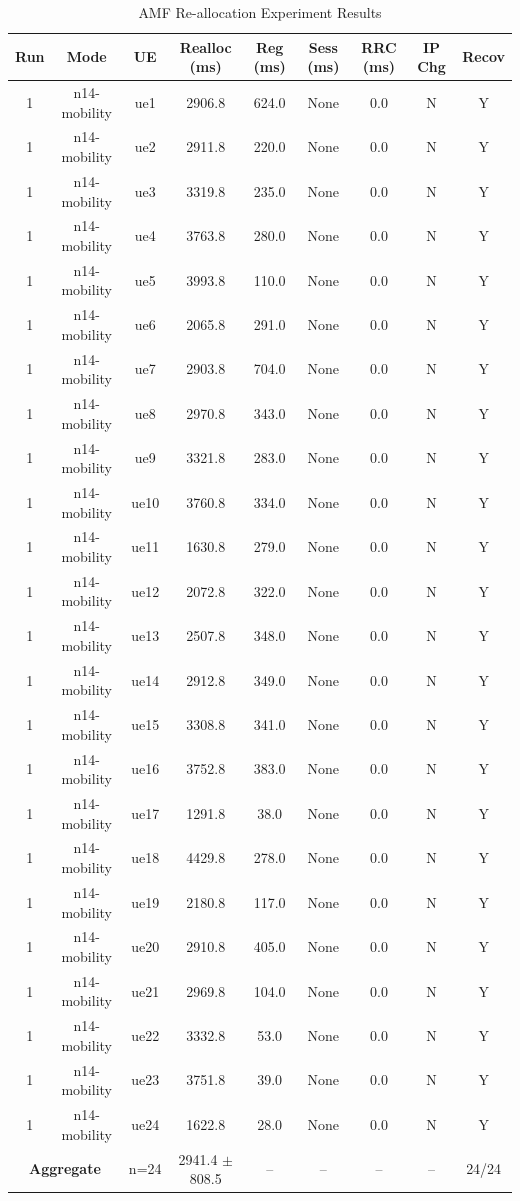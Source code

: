 \begin{table}[ht]
\centering
\begin{tabular}{|c|c|c|c|c|c|c|c|c|}
\hline
Run & Mode & UE & Realloc (ms) & Reg (ms) & Sess (ms) & RRC (ms) & IP Chg & Recov \\
\hline
1 & n14-mobility & ue1 & 2906.8 & 624.0 & None & 0.0 & N & Y \\
1 & n14-mobility & ue2 & 2911.8 & 220.0 & None & 0.0 & N & Y \\
1 & n14-mobility & ue3 & 3319.8 & 235.0 & None & 0.0 & N & Y \\
1 & n14-mobility & ue4 & 3763.8 & 280.0 & None & 0.0 & N & Y \\
1 & n14-mobility & ue5 & 3993.8 & 110.0 & None & 0.0 & N & Y \\
1 & n14-mobility & ue6 & 2065.8 & 291.0 & None & 0.0 & N & Y \\
1 & n14-mobility & ue7 & 2903.8 & 704.0 & None & 0.0 & N & Y \\
1 & n14-mobility & ue8 & 2970.8 & 343.0 & None & 0.0 & N & Y \\
1 & n14-mobility & ue9 & 3321.8 & 283.0 & None & 0.0 & N & Y \\
1 & n14-mobility & ue10 & 3760.8 & 334.0 & None & 0.0 & N & Y \\
1 & n14-mobility & ue11 & 1630.8 & 279.0 & None & 0.0 & N & Y \\
1 & n14-mobility & ue12 & 2072.8 & 322.0 & None & 0.0 & N & Y \\
1 & n14-mobility & ue13 & 2507.8 & 348.0 & None & 0.0 & N & Y \\
1 & n14-mobility & ue14 & 2912.8 & 349.0 & None & 0.0 & N & Y \\
1 & n14-mobility & ue15 & 3308.8 & 341.0 & None & 0.0 & N & Y \\
1 & n14-mobility & ue16 & 3752.8 & 383.0 & None & 0.0 & N & Y \\
1 & n14-mobility & ue17 & 1291.8 & 38.0 & None & 0.0 & N & Y \\
1 & n14-mobility & ue18 & 4429.8 & 278.0 & None & 0.0 & N & Y \\
1 & n14-mobility & ue19 & 2180.8 & 117.0 & None & 0.0 & N & Y \\
1 & n14-mobility & ue20 & 2910.8 & 405.0 & None & 0.0 & N & Y \\
1 & n14-mobility & ue21 & 2969.8 & 104.0 & None & 0.0 & N & Y \\
1 & n14-mobility & ue22 & 3332.8 & 53.0 & None & 0.0 & N & Y \\
1 & n14-mobility & ue23 & 3751.8 & 39.0 & None & 0.0 & N & Y \\
1 & n14-mobility & ue24 & 1622.8 & 28.0 & None & 0.0 & N & Y \\
\multicolumn{2}{|c|}{\textbf{Aggregate}} & n=24 & 2941.4 $\pm$ 808.5 & -- & -- & -- & -- & 24/24 \\
\hline
\end{tabular}
\caption{AMF Re-allocation Experiment Results}
\label{tab:amf_realloc}
\end{table}
